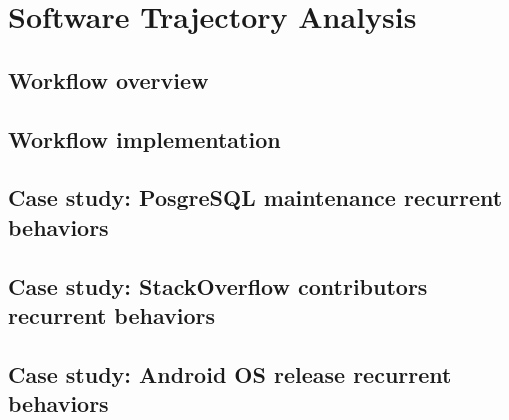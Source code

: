 \chapter{Software Trajectory Analysis}\label{chapter_sta}
\section{Workflow overview}
\section{Workflow implementation}
\section{Case study: PosgreSQL maintenance recurrent behaviors}
\section{Case study: StackOverflow contributors recurrent behaviors}
\section{Case study: Android OS release recurrent behaviors}
